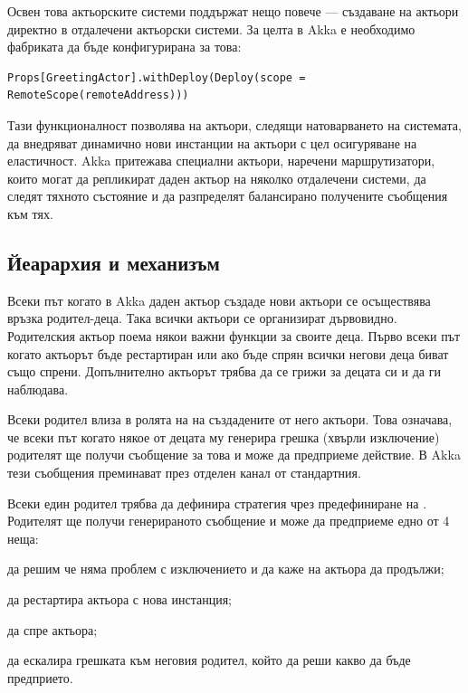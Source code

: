 Освен това актьорските системи поддържат нещо повече — създаване на актьори директно в отдалечени актьорски системи. За целта в Akka е необходимо  фабриката да бъде конфигурирана за това:

\begin{lstlisting}
Props[GreetingActor].withDeploy(Deploy(scope = RemoteScope(remoteAddress)))
\end{lstlisting}

Тази функционалност позволява на актьори, следящи натоварването на системата, да внедряват динамично нови инстанции на актьори с цел осигуряване на еластичност. Akka притежава специални актьори, наречени маршрутизатори, които могат да репликират даден актьор на няколко отдалечени системи, да следят тяхното състояние и да разпределят балансирано получените съобщения към тях.

\subsection{Йеарархия и  механизъм}

Всеки път когато в Akka даден актьор създаде нови актьори се осъществява връзка родител-деца. Така всички актьори се организират дървовидно. Родителския актьор поема някои важни функции за своите деца. Първо всеки път когато актьорът бъде рестартиран или ако бъде спрян всички негови деца биват също спрени. Допълнително актьорът трябва да се грижи за децата си и да ги наблюдава.

Всеки родител влиза в ролята на  на създадените от него актьори. Това означава, че всеки път когато някое от децата му генерира грешка (хвърли изключение) родителят ще получи съобщение за това и може да предприеме действие. В Akka тези съобщения преминават през отделен канал от стандартния.

Всеки един родител трябва да дефинира  стратегия чрез предефиниране на . Родителят ще получи генерираното съобщение и може да предприеме едно от 4 неща:

\begin{itemize*}
  \item да решим че няма проблем с изключението и да каже на актьора да продължи;
  \item да рестартира актьора с нова инстанция;
  \item да спре актьора;
  \item да ескалира грешката към неговия родител, който да реши какво да бъде предприето.
\end{itemize*}

